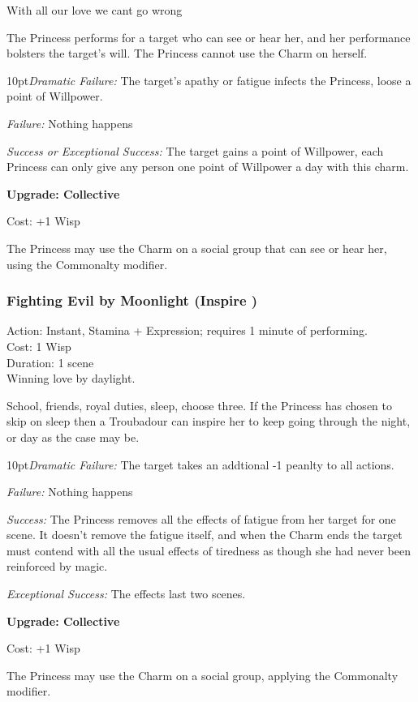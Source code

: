 \noindent With all our love we cant go wrong

The Princess performs for a target who can see or hear her, and her performance bolsters the target's will. The Princess cannot use the Charm on herself.

\begin{myindentpar}{10pt}\emph{Dramatic Failure:} The target's apathy or fatigue infects the Princess, loose a point of Willpower. 
 
 \emph{Failure:} Nothing happens
 
 \emph{Success or Exceptional Success:} The target gains a point of Willpower, each Princess can only give any person one point of Willpower a day with this charm. 
 
 \textbf{Upgrade: Collective}

\noindent Cost: +1 Wisp

The Princess may use the Charm on a social group that can see or hear her, using the Commonalty modifier. \end{myindentpar}

\subsubsection*{Fighting Evil by Moonlight (Inspire \textbullet\textbullet)}

\noindent Action: Instant, Stamina + Expression; requires 1 minute of performing. \\

\noindent Cost: 1 Wisp\\

\noindent Duration: 1 scene\\

Winning love by daylight.

School, friends, royal duties, sleep, choose three. If the Princess has chosen to skip on sleep then a Troubadour can inspire her to keep going through the night, or day as the case may be.

\begin{myindentpar}{10pt}\emph{Dramatic Failure:} The target takes an addtional -1 peanlty to all actions. 
 
 \emph{Failure:} Nothing happens
 
 \emph{Success:} The Princess removes all the effects of fatigue from her target for one scene. It doesn’t remove the fatigue itself, and when the Charm ends the target must contend with all the usual effects of tiredness as though she had never been reinforced by magic.
 
 \emph{Exceptional Success:} The effects last two scenes. 
 
\textbf{Upgrade: Collective}

Cost: +1 Wisp

The Princess may use the Charm on a social group, applying the Commonalty modifier. \end{myindentpar}

